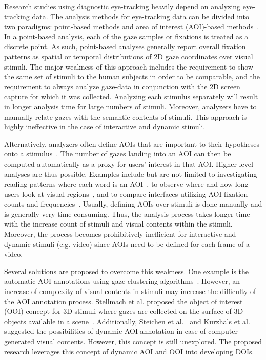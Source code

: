 Research studies using diagnostic eye-tracking heavily depend on analyzing eye-tracking data. The analysis methods for eye-tracking data can be divided into two paradigms: point-based methods and area of interest (AOI)-based methods~\cite{Bla14}. In a point-based analysis, each of the gaze samples or fixations is treated as a discrete point. As such, point-based analyses generally report overall fixation patterns as spatial or temporal distributions of 2D gaze coordinates over visual stimuli. The major weakness of this approach includes the requirement to show the same set of stimuli to the human subjects in order to be comparable, and the requirement to always analyze gaze-data in conjunction with the 2D screen capture for which it was collected. Analyzing each stimulus separately will result in longer analysis time for large numbers of stimuli. Moreover, analyzers have to manually relate gazes with the semantic contents of stimuli. This approach is highly ineffective in the case of interactive and dynamic stimuli. 

Alternatively, analyzers often define AOIs that are important to their hypotheses onto a stimulus~\cite{Bla14}. The number of gazes landing into an AOI can then be computed automatically as a proxy for users’ interest in that AOI. Higher level analyses are thus possible. Examples include but are not limited to investigating reading patterns where each word is an AOI~\cite{Bey05, SR08}, to observe where and how long users look at visual regions~\cite{Coco09, Kim12}, and to compare interfaces utilizing AOI fixation counts and frequencies~\cite{Coletkin09}. Usually, defining AOIs over stimuli is done manually and is generally very time consuming. Thus, the analysis process takes longer time with the increase count of stimuli and visual contents within the stimuli. Moreover, the process becomes prohibitively inefficient for interactive and dynamic stimuli (e.g. video) since AOIs need to be defined for each frame of a video. 

Several solutions are proposed to overcome this weakness. One example is the automatic AOI annotations using gaze clustering algorithms~\cite{Pri00, San04, Dru14}. However, an increase of complexity of visual contents in stimuli may increase the difficulty of the AOI annotation process. Stellmach et al. proposed the object of interest (OOI) concept for 3D stimuli where gazes are collected on the surface of 3D objects available in a scene~\cite{Ste10}. Additionally, Steichen et al.~\cite{Ste13} and Kurzhals et al.~\cite{Kur14} suggested the possibilities of dynamic AOI annotation in case of computer generated visual contents. However, this concept is still unexplored. The proposed research leverages this concept of dynamic AOI and OOI into developing DOIs. 

